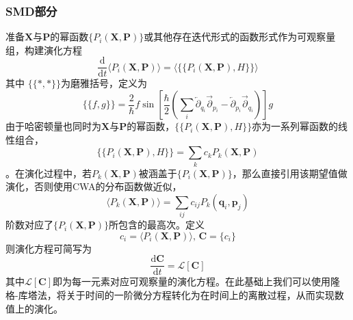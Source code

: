 \subsubsection{SMD部分}
准备$\boldsymbol{X}$与$\boldsymbol{P}$的幂函数$\{P_i(\boldsymbol{X},\boldsymbol{P})\}$或其他存在迭代形式的函数形式作为可观察量组，构建演化方程
\begin{equation}
\frac{\mathrm{d}}{\mathrm{d} t} \langle P_i(\boldsymbol{X},\boldsymbol{P}) \rangle = \langle \{\{P_i(\boldsymbol{X},\boldsymbol{P}), H\}\} \rangle
\end{equation}
其中 $\{\{ *, * \}\}$为磨雅括号，定义为
 \begin{equation}
	 \{\{f, g\}\}=\frac{2}{\hbar} f \sin \left[\frac{\hbar}{2}\left(\sum_{i} \overleftarrow{\partial}_{q_{i}} \overrightarrow{\partial}_{p_{i}}-\overleftarrow{\partial}_{p_{i}} \overrightarrow{\partial}_{q_{i}}\right)\right] g
\end{equation}
由于哈密顿量也同时为$\boldsymbol{X}$与$\boldsymbol{P}$的幂函数，$\{\{P_i(\boldsymbol{X},\boldsymbol{P}), H\}\}$亦为一系列幂函数的线性组合，
\begin{equation}
\{\{P_i(\boldsymbol{X},\boldsymbol{P}), H\}\} = \sum_k c_k P_k(\boldsymbol{X},\boldsymbol{P})
\end{equation}
。在演化过程中，若$P_k(\boldsymbol{X},\boldsymbol{P})$被涵盖于$\{P_i(\boldsymbol{X},\boldsymbol{P})\}$，那么直接引用该期望值做演化，否则使用CWA的分布函数做近似，
\begin{equation}
\langle P_k(\boldsymbol{X},\boldsymbol{P}) \rangle = \sum_{ij} c_{ij} P_k(\boldsymbol{q}_i,\boldsymbol{p}_j)
\end{equation}
阶数对应了$\{P_i(\boldsymbol{X},\boldsymbol{P})\}$所包含的最高次。定义
\begin{equation}
c_i = \langle P_i(\boldsymbol{X},\boldsymbol{P}) \rangle, \, \boldsymbol{C} = \{c_i\}
\end{equation}
则演化方程可简写为
\begin{equation}
\frac{\mathrm{d}  \boldsymbol{C}}{\mathrm{d} t} = \mathcal{L}[\boldsymbol{C}]
\end{equation}
其中$\mathcal{L}[\boldsymbol{C}]$即为每一元素对应可观察量的演化方程。在此基础上我们可以使用隆格-库塔法，将关于时间的一阶微分方程转化为在时间上的离散过程，从而实现数值上的演化。





